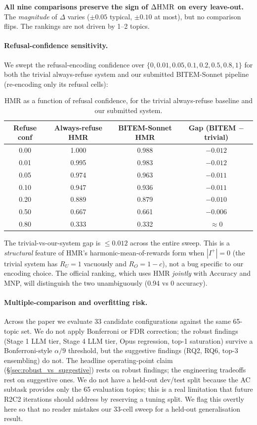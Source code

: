 \documentclass[11pt,a4paper]{article}
\newcommand{\HMR}{\textsc{HMR}}
\begin{document}
\noindent \textbf{All nine comparisons preserve the sign of $\Delta\HMR$
on every leave-out.} The \emph{magnitude} of $\Delta$ varies
($\pm 0.05$ typical, $\pm 0.10$ at most), but no comparison flips. The
rankings are not driven by 1--2 topics.

\paragraph{Refusal-confidence sensitivity.}
We swept the refusal-encoding confidence over $\{0, 0.01, 0.05, 0.1,
0.2, 0.5, 0.8, 1\}$ for both the trivial always-refuse system and our
submitted BITEM-Sonnet pipeline (re-encoding only its refusal cells):

\begin{table}[h]
\centering
\caption{HMR as a function of refusal confidence, for the trivial
always-refuse baseline and our submitted system.}
\label{tab:refusal_conf_sweep}
\small
\begin{tabular}{ccc|c}
\toprule
Refuse conf & Always-refuse HMR & BITEM-Sonnet HMR & Gap (BITEM $-$ trivial) \\
\midrule
0.00 & 1.000 & 0.988 & $-0.012$ \\
0.01 & 0.995 & 0.983 & $-0.012$ \\
0.05 & 0.974 & 0.963 & $-0.011$ \\
0.10 & 0.947 & 0.936 & $-0.011$ \\
0.20 & 0.889 & 0.879 & $-0.010$ \\
0.50 & 0.667 & 0.661 & $-0.006$ \\
0.80 & 0.333 & 0.332 & $\approx 0$ \\
\bottomrule
\end{tabular}
\end{table}

\noindent The trivial-vs-our-system gap is $\leq 0.012$ across the
entire sweep. This is a \emph{structural} feature of HMR's
harmonic-mean-of-rewards form when $|I^+|=0$ (the trivial system has
$R_U = 1$ vacuously and $R_O = 1 - c$), not a bug specific to our
encoding choice. The official ranking, which uses HMR \emph{jointly}
with Accuracy and MNP, will distinguish the two unambiguously
(0.94 vs 0 accuracy).

\paragraph{Multiple-comparison and overfitting risk.}
Across the paper we evaluate 33 candidate configurations against the
same 65-topic set. We do not apply Bonferroni or FDR correction; the
robust findings (Stage 1 LLM tier, Stage 4 LLM tier, Opus regression,
top-1 saturation) survive a Bonferroni-style $\alpha/9$ threshold,
but the suggestive findings (RQ2, RQ6, top-3 ensembling) do not.
The headline operating-point claim
(\S\ref{sec:robust_vs_suggestive}) rests on robust findings; the
engineering tradeoffs rest on suggestive ones. We do not have a held-out
dev/test split because the AC subtask provides only the 65 evaluation
topics; this is a real limitation that future R2C2 iterations should
address by reserving a tuning split. We flag this overtly here so
that no reader mistakes our 33-cell sweep for a held-out generalisation
result.
\end{document}
